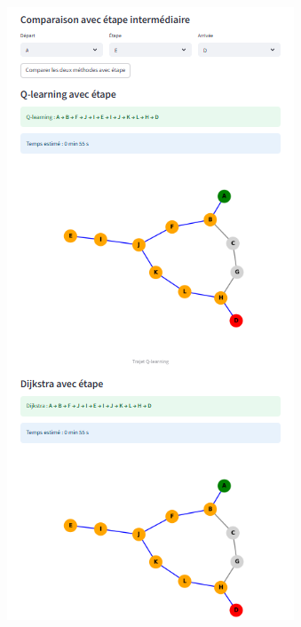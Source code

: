 \documentclass{article}
\begin{document}
\begin{figure}[htbp]
  \centering
  \begin{minipage}[b]{0.45\textwidth}
    \centering
    \includegraphics[width=\textwidth]{image8.png}

\end{minipage}
\end{figure}
\end{document}
